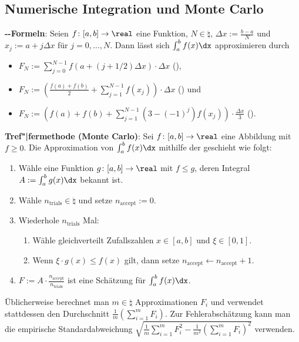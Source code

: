 \pagebreak

\subsection{%
    Numerische Integration und Monte Carlo%
}

\textbf{--Formeln}:
Seien $f\colon [a, b] \to \real$ eine Funktion, $N \in \natural$,
$\Delta x := \frac{b - a}{N}$ und $x_j := a + j \Delta x$ für $j = 0, \dotsc, N$.
Dann lässt sich $\int_a^b f(x) \dx$ approximieren durch
\begin{itemize}
    \item
    $F_N := \sum_{j=0}^{N-1} f(a + (j+1/2) \Delta x) \cdot \Delta x$
    (),
    
    \item
    $F_N := \left(\frac{f(a) + f(b)}{2} + \sum_{j=1}^{N-1} f(x_j)\right) \cdot \Delta x$
    () und
    
    \item
    $F_N := \left(f(a) + f(b) + \sum_{j=1}^{N-1} (3 - (-1)^j) f(x_j)\right)
    \cdot \frac{\Delta x}{3}$
    ().
\end{itemize}

\linie

\textbf{Tref"|fermethode (Monte Carlo)}:
Sei $f\colon [a, b] \to \real$ eine Abbildung mit $f \ge 0$.
Die Approximation von $\int_a^b f(x) \dx$ mithilfe der 
geschieht wie folgt:
\begin{enumerate}
    \item
    Wähle eine Funktion $g\colon [a, b] \to \real$ mit $f \le g$, deren Integral
    $A := \int_a^b g(x) \dx$ bekannt ist.
    
    \item
    Wähle $n_{\text{trials}} \in \natural$ und setze $n_{\text{accept}} := 0$.
    
    \item
    Wiederhole $n_{\text{trials}}$ Mal:
    \begin{enumerate}
        \item
        Wähle gleichverteilt Zufallszahlen $x \in [a, b]$ und $\xi \in [0, 1]$.
        
        \item
        Wenn $\xi \cdot g(x) \le f(x)$ gilt,
        dann setze $n_{\text{accept}} \leftarrow n_{\text{accept}} + 1$.
    \end{enumerate}
    
    \item
    $F := A \cdot \frac{n_{\text{accept}}}{n_{\text{trials}}}$ ist eine Schätzung für
    $\int_a^b f(x) \dx$.
\end{enumerate}
Üblicherweise berechnet man $m \in \natural$ Approximationen $F_i$ und
verwendet stattdessen den Durchschnitt $\frac{1}{m} (\sum_{i=1}^m F_i)$.
Zur Fehlerabschätzung kann man die empirische Standardabweichung
$\sqrt{\frac{1}{m} \sum_{i=1}^m F_i^2 - \frac{1}{m^2} (\sum_{i=1}^m F_i)^2}$ verwenden.

